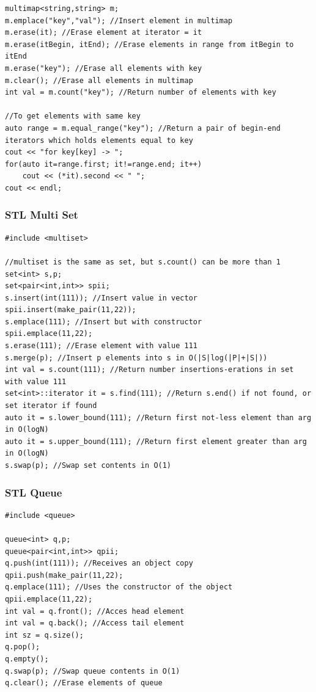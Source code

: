 \documentclass[twoside]{article}
\begin{document}
\begin{multicols*}{2}
\begin{verbatim}
multimap<string,string> m;
m.emplace("key","val"); //Insert element in multimap
m.erase(it); //Erase element at iterator = it
m.erase(itBegin, itEnd); //Erase elements in range from itBegin to itEnd
m.erase("key"); //Erase all elements with key
m.clear(); //Erase all elements in multimap
int val = m.count("key"); //Return number of elements with key

//To get elements with same key
auto range = m.equal_range("key"); //Return a pair of begin-end iterators which holds elements equal to key
cout << "for key[key] -> ";
for(auto it=range.first; it!=range.end; it++)
	cout << (*it).second << " ";
cout << endl;

\end{verbatim}

\subsubsectionfont{\large\bfseries\sffamily\underline}
\subsubsection*{STL Multi Set}
\begin{verbatim}
#include <multiset>

//multiset is the same as set, but s.count() can be more than 1
set<int> s,p;
set<pair<int,int>> spii;
s.insert(int(111)); //Insert value in vector
spii.insert(make_pair(11,22));
s.emplace(111); //Insert but with constructor
spii.emplace(11,22);
s.erase(111); //Erase element with value 111
s.merge(p); //Insert p elements into s in O(|S|log(|P|+|S|))
int val = s.count(111); //Return number insertions-erations in set with value 111
set<int>::iterator it = s.find(111); //Return s.end() if not found, or set iterator if found
auto it = s.lower_bound(111); //Return first not-less element than arg in O(logN)
auto it = s.upper_bound(111); //Return first element greater than arg in O(logN)
s.swap(p); //Swap set contents in O(1)

\end{verbatim}

\subsubsectionfont{\large\bfseries\sffamily\underline}
\subsubsection*{STL Queue}
\begin{verbatim}
#include <queue>

queue<int> q,p;
queue<pair<int,int>> qpii;
q.push(int(111)); //Receives an object copy
qpii.push(make_pair(11,22);
q.emplace(111); //Uses the constructor of the object
qpii.emplace(11,22);
int val = q.front(); //Acces head element
int val = q.back(); //Access tail element
int sz = q.size();
q.pop();
q.empty();
q.swap(p); //Swap queue contents in O(1)
q.clear(); //Erase elements of queue


\end{verbatim}
\end{multicols*}
\end{document}
